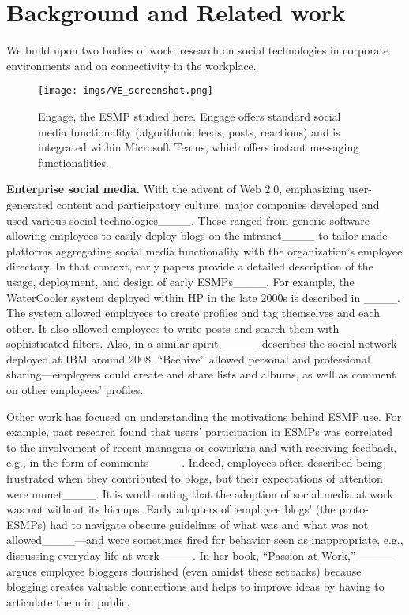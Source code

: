 \section{Background and Related work}
We build upon two bodies of work: research on social technologies in corporate environments and on connectivity in the workplace.

\begin{figure*}[t]
    \centering
    \texttt{[image: imgs/VE\_screenshot.png]}
    \caption{Engage, the ESMP studied here. Engage offers standard social media functionality (algorithmic feeds, posts, reactions) and is integrated within Microsoft Teams, which offers instant messaging functionalities.}
    \label{fig:enter-label}
\end{figure*}

\vspace{0.5mm}
\noindent
\textbf{Enterprise social media.}
With the advent of Web 2.0, emphasizing user-generated content and participatory culture, major companies developed and used various social technologies____.
These ranged from generic software allowing employees to easily deploy blogs on the intranet____ to tailor-made platforms aggregating social media functionality with the organization's employee directory. 
In that context, early papers provide a detailed description of the usage, deployment, and design of early ESMPs____. 
For example, the WaterCooler system deployed within HP in the late 2000s is described in ____. The system allowed employees to create profiles and tag themselves and each other. It also allowed employees 
to write posts and search them with sophisticated filters.
Also, in a similar spirit,  ____ describes the social network deployed at IBM around 2008. ``Beehive'' allowed personal and professional sharing---employees could create and share lists and albums, as well as comment on other employees' profiles.

Other work has focused on understanding the motivations behind ESMP use. 
For example, past research found that users' participation in ESMPs was correlated to the involvement of recent managers or coworkers and with receiving feedback, e.g., in the form of comments____.
Indeed, employees often described being frustrated when they contributed to blogs, but their expectations of attention were unmet____. 
It is worth noting that the adoption of social media at work was not without its hiccups. Early adopters of `employee blogs' (the proto-ESMPs) had to navigate obscure guidelines of what was and what was not allowed____---and were sometimes fired for behavior seen as inappropriate, e.g., discussing everyday life at work____. In her book, ``Passion at Work,'' ____ argues employee bloggers flourished (even amidst these setbacks) because blogging creates valuable connections and helps to improve ideas by having to articulate them in public.

